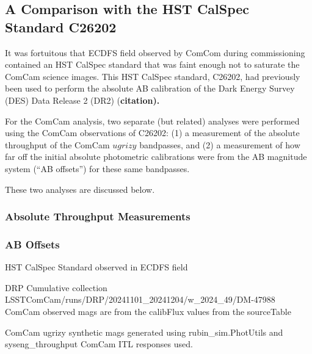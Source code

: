 \subsection{A Comparison with the HST CalSpec Standard C26202}

It was fortuitous that ECDFS field observed by ComCom during commissioning 
contained an HST CalSpec standard that was faint enough not to saturate the
ComCam science images.  This HST CalSpec standard, C26202, had previously
been used to perform the absolute AB calibration of the Dark Energy Survey 
(DES) Data Release 2 (DR2) (\bf{citation}). 

For the ComCam analysis, two separate (but related) analyses were performed
using the ComCam observations of C26202:  (1) a measurement of the absolute 
throughput of the ComCam $ugrizy$ bandpasses, and (2) a measurement of how 
far off the initial absolute photometric calibrations were from the AB 
magnitude system (``AB offsets'') for these same bandpasses.

These two analyses are discussed below.

\subsubsection{Absolute Throughput Measurements}



\subsubsection{AB Offsets}

HST CalSpec Standard observed in ECDFS field

DRP Cumulative collection LSSTComCam/runs/DRP/20241101_20241204/w_2024_49/DM-47988
ComCam observed mags are from the calibFlux values from the sourceTable

ComCam ugrizy synthetic mags generated using rubin_sim.PhotUtils and syseng_throughput
ComCam ITL responses used.

